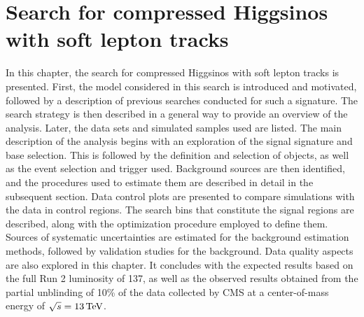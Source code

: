 \chapter{Search for compressed Higgsinos with soft lepton tracks}
\label{sec:search}

In this chapter, the search for compressed Higgsinos with soft lepton tracks is presented.
First, the model considered in this search is introduced and motivated, followed by a description of previous searches conducted for such a signature. The search strategy is then described in a general way to provide an overview of the analysis. Later, the data sets and simulated samples used are listed. The main description of the analysis begins with an exploration of the signal signature and base selection. This is followed by the definition and selection of objects, as well as the event selection and trigger used. Background sources are then identified, and the procedures used to estimate them are described in detail in the subsequent section. Data control plots are presented to compare simulations with the data in control regions. The search bins that constitute the signal regions are described, along with the optimization procedure employed to define them. Sources of systematic uncertainties are estimated for the background estimation methods, followed by validation studies for the background. Data quality aspects are also explored in this chapter. It concludes with the expected results based on the full Run 2 luminosity of 137\fbinv, as well as the observed results obtained from the partial unblinding of 10\% of the data collected by CMS at a center-of-mass energy of $\sqrt{s}=13\,\text{Te\hspace{-.08em}V}$.





























